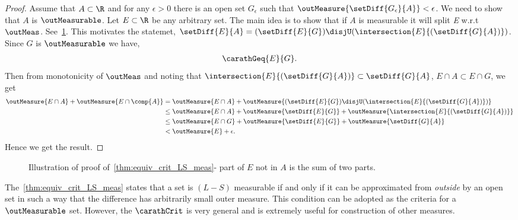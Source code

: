 \begin{proof}
    Assume that $A \subset \R$ and for any $\epsilon > 0$ there is an open set $G_{\epsilon}$ such
    that $\outMeasure{\setDiff{G_{\epsilon}}{A}} < \epsilon$. We need to show that $A$ is
    $\outMeasurable$. Let $E \subset \R$ be any arbitrary set. The main idea is to show that if $A$
    is measurable it will split \emph{E} w.r.t $\outMeas$.
    See~\ref{fig:tikz:equiv_ls_measurability}. This motivates the statemet,
    $\setDiff{E}{A} = (\setDiff{E}{G}) \disjU (\intersection{E}{(\setDiff{G}{A})})$. 
    Since $G$ is $\outMeasurable$ we have,
    \begin{align*}\carathGeq{E}{G}.\end{align*} Then from
    monotonicity of $\outMeas$ and noting that $\intersection{E}{(\setDiff{G}{A})} \subset 
    \setDiff{G}{A}$, $E\cap A \subset E\cap G$, we get
    \begin{align*}
	\outMeasure{E\cap A} + \outMeasure{E\cap\comp{A}} &= \outMeasure{E\cap A} 
	+ \outMeasure{(\setDiff{E}{G}) \disjU (\intersection{E}{(\setDiff{G}{A})})} \\
	&\leq \outMeasure{E\cap A} + \outMeasure{\setDiff{E}{G}} 
	+ \outMeasure{\intersection{E}{(\setDiff{G}{A})}} \\
	&\leq \outMeasure{E\cap G} + \outMeasure{\setDiff{E}{G}} 
	+ \outMeasure{\setDiff{G}{A}} \\
	&< \outMeasure{E} + \epsilon. \\
    \end{align*}
    Hence we get the result.
\end{proof}

\begin{figure}
    
    \caption{Illustration of proof of~\ref{thm:equiv_crit_LS_meas}- part of $E$ not in $A$ is the
	sum of two parts.}\label{fig:tikz:equiv_ls_measurability}
\end{figure}
The~\ref{thm:equiv_crit_LS_meas} states that a set is $(L-S)$ measurable if and only if it can be
approximated from \emph{outside} by an open set in such a way that the difference has arbitrarily
small outer measure. This condition can be adopted as the criteria for a $\outMeasurable$ set. 
However, the $\carathCrit$ is very general and is extremely useful for construction of other measures.

